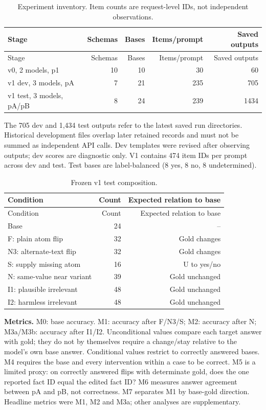 \begingroup\small\setlength{\tabcolsep}{4pt}
\begin{longtable}{lrrrr}
\caption{Experiment inventory. Item counts are request-level IDs, not independent observations.}\\
\toprule
Stage & Schemas & Bases & Items/prompt & Saved outputs \\
\midrule\endfirsthead
\toprule
Stage & Schemas & Bases & Items/prompt & Saved outputs \\
\midrule\endhead
\bottomrule\endfoot
v0, 2 models, p1 & 10 & 10 & 30 & 60 \\
v1 dev, 3 models, pA & 7 & 21 & 235 & 705 \\
v1 test, 3 models, pA/pB & 8 & 24 & 239 & 1434 \\
\end{longtable}\endgroup


The 705 dev and 1,434 test outputs refer to the latest saved run directories. Historical development files overlap later retained records and must not be summed as independent API calls. Dev templates were revised after observing outputs; dev scores are diagnostic only. V1 contains 474 item IDs per prompt across dev and test. Test bases are label-balanced (8 yes, 8 no, 8 undetermined).

\begingroup\small\setlength{\tabcolsep}{4pt}
\begin{longtable}{lrr}
\caption{Frozen v1 test composition.}\\
\toprule
Condition & Count & Expected relation to base \\
\midrule\endfirsthead
\toprule
Condition & Count & Expected relation to base \\
\midrule\endhead
\bottomrule\endfoot
Base & 24 & -- \\
F: plain atom flip & 32 & Gold changes \\
N3: alternate-text flip & 32 & Gold changes \\
S: supply missing atom & 16 & U to yes/no \\
N: same-value near variant & 39 & Gold unchanged \\
I1: plausible irrelevant & 48 & Gold unchanged \\
I2: harmless irrelevant & 48 & Gold unchanged \\
\end{longtable}\endgroup


\textbf{Metrics.} M0: base accuracy. M1: accuracy after F/N3/S; M2: accuracy after N; M3a/M3b: accuracy after I1/I2. Unconditional values compare each target answer with gold; they do not by themselves require a change/stay relative to the model's own base answer. Conditional values restrict to correctly answered bases. M4 requires the base and every intervention within a case to be correct. M5 is a limited proxy: on correctly answered flips with determinate gold, does the one reported fact ID equal the edited fact ID? M6 measures answer agreement between pA and pB, not correctness. M7 separates M1 by base-gold direction. Headline metrics were M1, M2 and M3a; other analyses are supplementary.

